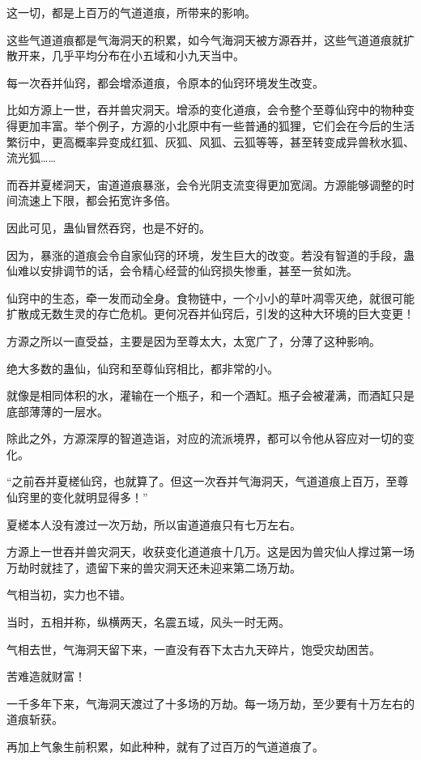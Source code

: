 \begin{this_body}
这一切，都是上百万的气道道痕，所带来的影响。

这些气道道痕都是气海洞天的积累，如今气海洞天被方源吞并，这些气道道痕就扩散开来，几乎平均分布在小五域和小九天当中。

每一次吞并仙窍，都会增添道痕，令原本的仙窍环境发生改变。

比如方源上一世，吞并兽灾洞天。增添的变化道痕，会令整个至尊仙窍中的物种变得更加丰富。举个例子，方源的小北原中有一些普通的狐狸，它们会在今后的生活繁衍中，更高概率异变成红狐、灰狐、风狐、云狐等等，甚至转变成异兽秋水狐、流光狐……

而吞并夏槎洞天，宙道道痕暴涨，会令光阴支流变得更加宽阔。方源能够调整的时间流速上下限，都会拓宽许多倍。

因此可见，蛊仙冒然吞窍，也是不好的。

因为，暴涨的道痕会令自家仙窍的环境，发生巨大的改变。若没有智道的手段，蛊仙难以安排调节的话，会令精心经营的仙窍损失惨重，甚至一贫如洗。

仙窍中的生态，牵一发而动全身。食物链中，一个小小的草叶凋零灭绝，就很可能扩散成无数生灵的存亡危机。更何况吞并仙窍后，引发的这种大环境的巨大变更！

方源之所以一直受益，主要是因为至尊太大，太宽广了，分薄了这种影响。

绝大多数的蛊仙，仙窍和至尊仙窍相比，都非常的小。

就像是相同体积的水，灌输在一个瓶子，和一个酒缸。瓶子会被灌满，而酒缸只是底部薄薄的一层水。

除此之外，方源深厚的智道造诣，对应的流派境界，都可以令他从容应对一切的变化。

“之前吞并夏槎仙窍，也就算了。但这一次吞并气海洞天，气道道痕上百万，至尊仙窍里的变化就明显得多！”

夏槎本人没有渡过一次万劫，所以宙道道痕只有七万左右。

方源上一世吞并兽灾洞天，收获变化道道痕十几万。这是因为兽灾仙人撑过第一场万劫时就挂了，遗留下来的兽灾洞天还未迎来第二场万劫。

气相当初，实力也不错。

当时，五相并称，纵横两天，名震五域，风头一时无两。

气相去世，气海洞天留下来，一直没有吞下太古九天碎片，饱受灾劫困苦。

苦难造就财富！

一千多年下来，气海洞天渡过了十多场的万劫。每一场万劫，至少要有十万左右的道痕斩获。

再加上气象生前积累，如此种种，就有了过百万的气道道痕了。


\end{this_body}
